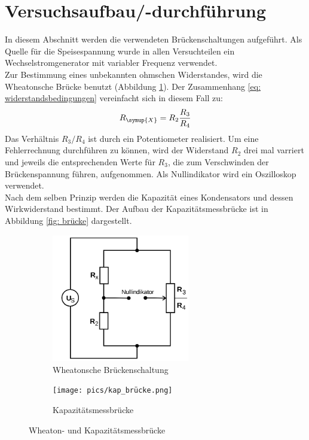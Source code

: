\section{Versuchsaufbau/-durchführung}\label{abs: aufbau}
In diesem Abschnitt werden die verwendeten Brückenschaltungen aufgeführt. Als Quelle für
die Speisespannung wurde in allen Versuchteilen ein Wechselstromgenerator mit variabler Frequenz
verwendet. \\
Zur Bestimmung eines unbekannten ohmschen Widerstandes, wird die Wheatonsche Brücke
benutzt (Abbildung \ref{fig: wheaton}).
Der Zusammenhang \eqref{eq: widerstandsbedingungen} vereinfacht sich in diesem Fall zu:
\begin{equation}
  R_{\symup{X}} = R_2 \frac{R_3}{R_4}
\end{equation}
Das Verhältnis $R_3 / R_4$ ist durch ein Potentiometer realisiert. Um eine Fehlerrechnung durchführen
zu können, wird der Widerstand $R_2$ drei mal varriert und jeweils die entsprechenden Werte für $R_3$, die
zum Verschwinden der Brückenspannung führen, aufgenommen. Als Nullindikator wird ein Oszilloskop verwendet. \\
Nach dem selben Prinzip werden die Kapazität eines Kondensators und dessen Wirkwiderstand bestimmt. Der Aufbau
der Kapazitätsmessbrücke ist in Abbildung \ref{fig: brücke} dargestellt.

%
\begin{figure}
\centering
\begin{subfigure}{0.49\textwidth}
  \centering
  \includegraphics[width = 6cm]{pics/wheaton.png}
  \caption{Wheatonsche Brückenschaltung}
  \label{fig: wheaton}
\end{subfigure}
\begin{subfigure}{0.49\textwidth}
\centering
\texttt{[image: pics/kap\_brücke.png]}
\caption{Kapazitätsmessbrücke}
\label{fig: kapazität}
\end{subfigure}
\caption{Wheaton- und Kapazitätsmessbrücke \cite{anleitung302}}
\label{fig: kapind}
\end{figure}


